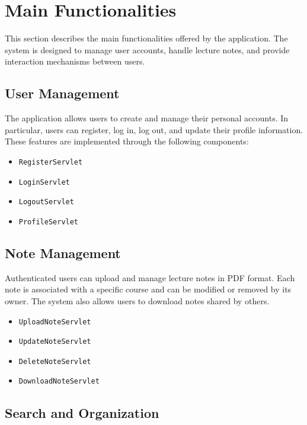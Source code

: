 \section{Main Functionalities}

This section describes the main functionalities offered by the application.
The system is designed to manage user accounts, handle lecture notes, and
provide interaction mechanisms between users.

\subsection{User Management}

The application allows users to create and manage their personal accounts.
In particular, users can register, log in, log out, and update their profile
information. These features are implemented through the following components:

\begin{itemize}
    \item \texttt{RegisterServlet}
    \item \texttt{LoginServlet}
    \item \texttt{LogoutServlet}
    \item \texttt{ProfileServlet}
\end{itemize}

\subsection{Note Management}

Authenticated users can upload and manage lecture notes in PDF format.
Each note is associated with a specific course and can be modified or removed
by its owner. The system also allows users to download notes shared by others.

\begin{itemize}
    \item \texttt{UploadNoteServlet}
    \item \texttt{UpdateNoteServlet}
    \item \texttt{DeleteNoteServlet}
    \item \texttt{DownloadNoteServlet}
\end{itemize}

\subsection{Search and Organization}

